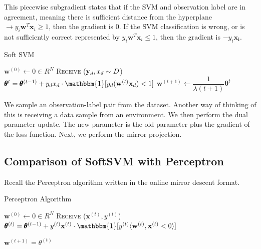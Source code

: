 \documentclass[11pt]{article}
\begin{document}
This piecewise subgradient states that if the SVM and observation label are in agreement, meaning there is sufficient distance from the hyperplane $\rightarrow y_i \mathbf{w}^T \mathbf{x}_i \geq 1$, then the gradient is 0. If the SVM classification is wrong, or is not sufficiently correct represented by $y_i \mathbf{w}^T \mathbf{x}_i \leq 1$, then the gradient is $-y_i \mathbf{x_i}$.

\begin{algorithm}[H]
\caption{Soft SVM}
\label{algo:SVM}
\begin{algorithmic}[1]
\STATE $\mathbf{w}^{(0)} \leftarrow 0 \in R^N$  \hfill
{}
\STATE \textsc{Receive} ($\textbf y_d, x_d \sim D$)  \hfill 
\STATE $\pmb{\theta}^t = \pmb{\theta}^{(t-1)} + y_d x_d \cdot \mathbbm{1}[y_d(\mathbf{w}^{(t)} \mathbf{x}_d) < 1]$  \hfill
\STATE $\mathbf{w}^{(t+1)}\leftarrow \dfrac{1}{\lambda (t+1)} \pmb{\theta}^t$  \hfill
\ENDFOR
\end{algorithmic}
\end{algorithm}

We sample an observation-label pair from the dataset. Another way of thinking of this is receiving a data sample from an environment. We then perform the dual parameter update. The new parameter is the old parameter plus the gradient of the loss function. Next, we perform the mirror projection.

\subsection{Comparison of SoftSVM with Perceptron}
Recall the Perceptron algorithm written in the online mirror descent format.
\begin{algorithm}[H]
\caption{Perceptron Algorithm}
\label{algo:Perceptrom}
\begin{algorithmic}[1]
\STATE $\textbf{w}^{(0)} \leftarrow 0 \in R^N$  \hfill
{}
\STATE \textsc{Receive} ($\mathbf{x}^{(t)}, y^{(t)}$) \hfill 
\STATE $\pmb{\theta}^{(t)} = \pmb{\theta}^{(t-1)} +y^{(t)} \mathbf{x}^{(t)} \cdot \mathbbm{1}[y^{(t)} \langle \mathbf{w}^{(t)}, \mathbf{x}^{(t)} < 0 \rangle] $ \hfill

\STATE $\mathbf{w}^{(t+1)} =  \theta^{(t)}$  \hfill 
\ENDFOR
\end{algorithmic}
\end{algorithm}
\end{document}
